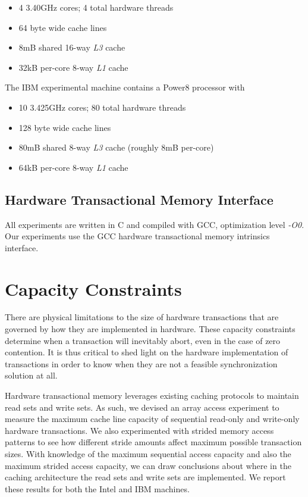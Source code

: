 \documentclass{article}
\begin{document}
\begin{spacing}{0}
\begin{itemize}
\item 4 3.40GHz cores; 4 total hardware threads
\item 64 byte wide cache lines
\item 8mB shared 16-way \textit{L3} cache
\item 32kB per-core 8-way \textit{L1} cache
\end{itemize}

The IBM experimental machine contains a Power8 processor with
\begin{itemize}
\item 10 3.425GHz cores; 80 total hardware threads
\item 128 byte wide cache lines
\item 80mB shared 8-way \textit{L3} cache (roughly 8mB per-core)
\item 64kB per-core 8-way \textit{L1} cache
\end{itemize}
\end{spacing}

\subsection{Hardware Transactional Memory Interface}
All experiments are written in C and compiled with GCC, optimization level
\textit{-O0}. Our experiments use the GCC hardware transactional memory
intrinsics interface.

\section{Capacity Constraints}
There are physical limitations to the size of hardware transactions that are
governed by how they are implemented in hardware. These capacity constraints
determine when a transaction will inevitably abort, even in the case of zero
contention. It is thus critical to shed light on the hardware implementation of
transactions in order to know when they are not a feasible synchronization
solution at all.

Hardware transactional memory leverages existing caching protocols to maintain
read sets and write sets. As such, we devised an array access experiment to
measure the maximum cache line capacity of sequential read-only and write-only
hardware transactions. We also experimented with strided memory access patterns
to see how different stride amounts affect maximum possible transaction sizes.
With knowledge of the maximum sequential access capacity and also the maximum
strided access capacity, we can draw conclusions about where in the caching
architecture the read sets and write sets are implemented. We report these
results for both the Intel and IBM machines.
\end{document}
